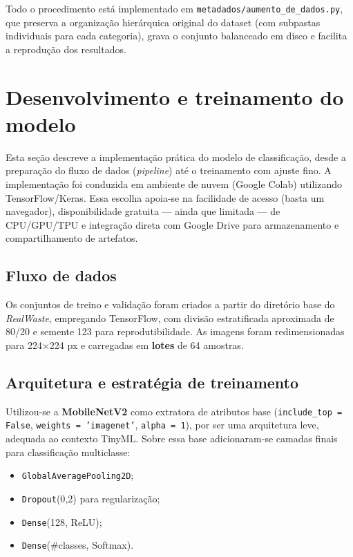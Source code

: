 \documentclass[repeatfields,xlists,xpacks,oneside]{ufrgscca}
\begin{document}
Todo o procedimento está implementado em \texttt{metadados/aumento\_de\_dados.py}, que preserva a organização hierárquica original do dataset (com subpastas individuais para cada categoria), grava o conjunto balanceado em disco e facilita a reprodução dos resultados.

\section{Desenvolvimento e treinamento do modelo}
\label{sec:treinamento}

Esta seção descreve a implementação prática do modelo de classificação, desde a preparação do fluxo de dados (\textit{pipeline}) até o treinamento com ajuste fino. A implementação foi conduzida em ambiente de nuvem (Google Colab) utilizando TensorFlow/Keras. Essa escolha apoia-se na facilidade de acesso (basta um navegador), disponibilidade gratuita — ainda que limitada — de CPU/GPU/TPU e integração direta com Google Drive para armazenamento e compartilhamento de artefatos.

\subsection{Fluxo de dados}
Os conjuntos de treino e validação foram criados a partir do diretório base do \textit{RealWaste}, empregando TensorFlow, com divisão estratificada aproximada de 80/20 e semente 123 para reprodutibilidade. As imagens foram redimensionadas para 224\(\times\)224 px e carregadas em \textbf{lotes} de 64 amostras.

\subsection{Arquitetura e estratégia de treinamento}
Utilizou-se a \textbf{MobileNetV2} como extratora de atributos base (\texttt{include\_top = False}, \texttt{weights = 'imagenet'}, \texttt{alpha = 1}), por ser uma arquitetura leve, adequada ao contexto TinyML. Sobre essa base adicionaram-se camadas finais para classificação multiclasse:

\begin{itemize}
    \item \texttt{GlobalAveragePooling2D};
    \item \texttt{Dropout}(0{,}2) para regularização;
    \item \texttt{Dense}(128, ReLU);
    \item \texttt{Dense}(\#classes, Softmax).
\end{itemize}
\end{document}
